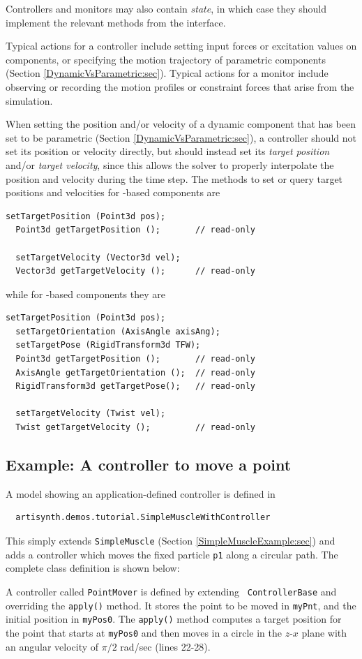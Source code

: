 Controllers and monitors may also contain {\it state}, in which case
they should implement the relevant methods from the
 interface.

Typical actions for a controller include setting input forces or
excitation values on components, or specifying the motion trajectory
of parametric components (Section \ref{DynamicVsParametric:sec}).
Typical actions for a monitor include observing or recording
the motion profiles or constraint forces that arise
from the simulation.

When setting the position and/or velocity of a dynamic component that
has been set to be parametric (Section \ref{DynamicVsParametric:sec}),
a controller should not set its position or velocity directly, but
should instead set its {\it target position} and/or {\it target
velocity}, since this allows the solver to properly interpolate the
position and velocity during the time step. The methods to set or
query target positions and velocities for
-based components are
\begin{lstlisting}[]
  setTargetPosition (Point3d pos);
  Point3d getTargetPosition ();       // read-only

  setTargetVelocity (Vector3d vel);
  Vector3d getTargetVelocity ();      // read-only
\end{lstlisting}
%
while for
-based components they are
\begin{lstlisting}[]
  setTargetPosition (Point3d pos);
  setTargetOrientation (AxisAngle axisAng);
  setTargetPose (RigidTransform3d TFW);
  Point3d getTargetPosition ();       // read-only
  AxisAngle getTargetOrientation ();  // read-only
  RigidTransform3d getTargetPose();   // read-only

  setTargetVelocity (Twist vel);
  Twist getTargetVelocity ();         // read-only
\end{lstlisting}
%

\subsection{Example: A controller to move a point}

A model showing an application-defined controller is defined in
%
\begin{verbatim}
  artisynth.demos.tutorial.SimpleMuscleWithController
\end{verbatim}
%
This simply extends {\tt SimpleMuscle} (Section
\ref{SimpleMuscleExample:sec}) and adds a controller which moves the
fixed particle {\tt p1} along a circular path.  The complete class
definition is shown below:
%
\lstset{numbers=left}

\lstset{numbers=none}
%
A controller called {\tt PointMover} is defined by extending {\tt
ControllerBase} and overriding the {\tt apply()} method. It stores the
point to be moved in {\tt myPnt}, and the initial position in
{\tt myPos0}. The {\tt apply()} method computes a target position for
the point that starts at {\tt myPos0} and then moves in a circle in the
$z$-$x$ plane with an angular velocity of $\pi/2$ rad/sec (lines 22-28).

